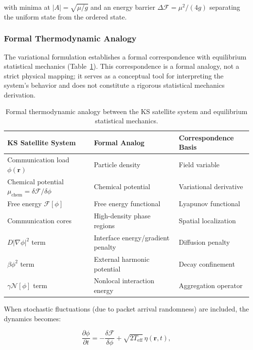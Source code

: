 \documentclass[sn-nature,pdflatex]{sn-jnl}
\begin{document}
with minima at $|A| = \sqrt{\mu/g}$ and an energy barrier $\Delta\mathcal{F} = \mu^2/(4g)$ separating the uniform state from the ordered state.

\subsubsection{Formal Thermodynamic Analogy}

The variational formulation establishes a formal correspondence with equilibrium statistical mechanics (Table~\ref{tab:thermo_analogy}). This correspondence is a formal analogy, not a strict physical mapping; it serves as a conceptual tool for interpreting the system's behavior and does not constitute a rigorous statistical mechanics derivation.

\begin{table}[htbp]
\centering
\caption{Formal thermodynamic analogy between the KS satellite system and equilibrium statistical mechanics.}
\label{tab:thermo_analogy}
\begin{tabular}{lll}
\toprule
KS Satellite System & Formal Analog & Correspondence Basis \\
\midrule
Communication load $\phi(\mathbf{r})$ & Particle density & Field variable \\
Chemical potential $\mu_{\text{chem}} = \delta\mathcal{F}/\delta\phi$ & Chemical potential & Variational derivative \\
Free energy $\mathcal{F}[\phi]$ & Free energy functional & Lyapunov functional \\
Communication cores & High-density phase regions & Spatial localization \\
$D|\nabla\phi|^2$ term & Interface energy/gradient penalty & Diffusion penalty \\
$\beta\phi^2$ term & External harmonic potential & Decay confinement \\
$\gamma \mathcal{N}[\phi]$ term & Nonlocal interaction energy & Aggregation operator \\
\bottomrule
\end{tabular}
\end{table}

When stochastic fluctuations (due to packet arrival randomness) are included, the dynamics becomes:

\begin{equation}
\frac{\partial \phi}{\partial t} = -\frac{\delta\mathcal{F}}{\delta\phi} + \sqrt{2T_{\text{eff}}}\,\eta(\mathbf{r}, t),
\end{equation}
\end{document}
